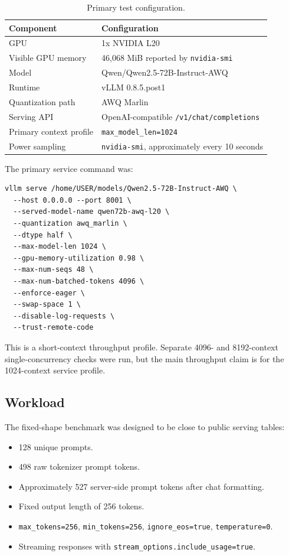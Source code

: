 \documentclass[11pt]{article}
\newcommand{\qwenawq}{Qwen2.5\nobreakdash-72B\nobreakdash-Instruct\nobreakdash-AWQ}
\begin{document}
\begin{table}[h]
\centering
\small
\begin{tabular}{ll}
\toprule
Component & Configuration \\
\midrule
GPU & 1x NVIDIA L20 \\
Visible GPU memory & 46,068 MiB reported by \texttt{nvidia-smi} \\
Model & Qwen/\qwenawq{} \\
Runtime & vLLM 0.8.5.post1 \\
Quantization path & AWQ Marlin \\
Serving API & OpenAI-compatible \texttt{/v1/chat/completions} \\
Primary context profile & \texttt{max\_model\_len=1024} \\
Power sampling & \texttt{nvidia-smi}, approximately every 10 seconds \\
\bottomrule
\end{tabular}
\caption{Primary test configuration.}
\label{tab:setup}
\end{table}

The primary service command was:

\begin{verbatim}
vllm serve /home/USER/models/Qwen2.5-72B-Instruct-AWQ \
  --host 0.0.0.0 --port 8001 \
  --served-model-name qwen72b-awq-l20 \
  --quantization awq_marlin \
  --dtype half \
  --max-model-len 1024 \
  --gpu-memory-utilization 0.98 \
  --max-num-seqs 48 \
  --max-num-batched-tokens 4096 \
  --enforce-eager \
  --swap-space 1 \
  --disable-log-requests \
  --trust-remote-code
\end{verbatim}

This is a short-context throughput profile. Separate 4096- and 8192-context
single-concurrency checks were run, but the main throughput claim is for the
1024-context service profile.

\subsection{Workload}

The fixed-shape benchmark was designed to be close to public serving tables:

\begin{itemize}
  \item 128 unique prompts.
  \item 498 raw tokenizer prompt tokens.
  \item Approximately 527 server-side prompt tokens after chat formatting.
  \item Fixed output length of 256 tokens.
  \item \texttt{max\_tokens=256}, \texttt{min\_tokens=256},
        \texttt{ignore\_eos=true}, \texttt{temperature=0}.
  \item Streaming responses with \texttt{stream\_options.include\_usage=true}.
\end{itemize}
\end{document}
